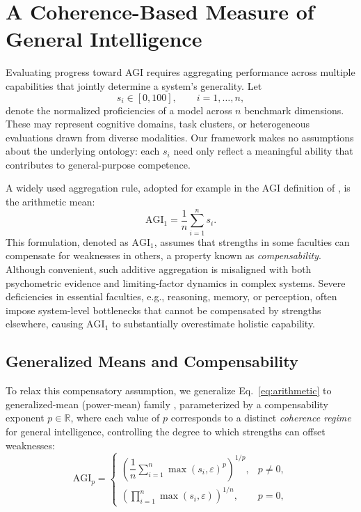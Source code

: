 \documentclass{article}
\begin{document}
\section{A Coherence-Based Measure of General Intelligence}


Evaluating progress toward AGI requires aggregating performance
across multiple capabilities that jointly determine a system’s generality. Let
\[
s_i \in [0,100], \qquad i = 1,\dots,n,
\]
denote the normalized proficiencies of a model across $n$ benchmark dimensions. These may represent
cognitive domains, task clusters, or heterogeneous evaluations drawn from diverse modalities. Our
framework makes no assumptions about the underlying ontology: each $s_i$ need only reflect a
meaningful ability that contributes to general-purpose competence.

A widely used aggregation rule, adopted for example in the AGI definition of
\citet{hendrycks2025agidefinition}, is the arithmetic mean:
\begin{equation}
\mathrm{AGI}_{1}
=
\frac{1}{n} \sum_{i=1}^{n} s_i .
\label{eq:arithmetic}
\end{equation}
This formulation, denoted as $\mathrm{AGI}_{1}$, assumes that strengths in some faculties can compensate for weaknesses in others, a property known as \emph{compensability}. Although convenient, such additive
aggregation is misaligned with both psychometric evidence and limiting-factor dynamics in complex
systems. Severe deficiencies in essential faculties, e.g., reasoning, memory, or perception, often
impose system-level bottlenecks that cannot be compensated by strengths elsewhere, causing
$\mathrm{AGI}_1$ to substantially overestimate holistic capability.

\subsection{Generalized Means and Compensability}

To relax this compensatory assumption, we generalize Eq.~\eqref{eq:arithmetic} to generalized-mean (power-mean)
family \citep{bullen2013handbook}, parameterized by a compensability exponent $p \in \mathbb{R}$, where each value of $p$ corresponds to a distinct \emph{coherence regime} for general intelligence, controlling the degree to which strengths can offset weaknesses:
\begin{equation}
\mathrm{AGI}_p =
\begin{cases}
\left( \dfrac{1}{n} \sum_{i=1}^{n} \max\!\left(s_i, \varepsilon\right)^{p} \right)^{\!\!1/p}, & p \neq 0, \\[10pt]
\left( \prod_{i=1}^{n} \max\!\left(s_i, \varepsilon\right) \right)^{\!1/n}, & p = 0 ,
\end{cases}
\label{eq:agip}
\end{equation}
\end{document}
